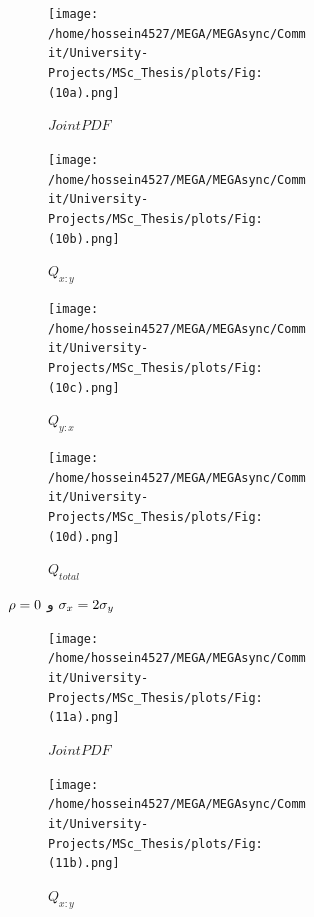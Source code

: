 \documentclass[a4paper,titlepage,12pt,fleqn,oneside]{report}
\begin{document}
	\begin{figure}[tbp]
		\centering
		\begin{subfigure}[b]{\textwidth}
			\renewcommand\thesubfigure{a}
			\begin{subfigure}[b]{0.24\textwidth}
				\renewcommand\thesubfigure{i}
				\centering
				\texttt{[image: /home/hossein4527/MEGA/MEGAsync/Commit/University-Projects/MSc\_Thesis/plots/Fig:(10a).png]}
				\caption{$Joint PDF$}
				\label{fig:3.1.1}
			\end{subfigure}
			\hfill
			\begin{subfigure}[b]{0.24\textwidth}
				\renewcommand\thesubfigure{ii}
				\centering
				\texttt{[image: /home/hossein4527/MEGA/MEGAsync/Commit/University-Projects/MSc\_Thesis/plots/Fig:(10b).png]}
				\caption{$Q_{x:y}$}
				\label{fig:3.1.2}
			\end{subfigure}
			\hfill
			\begin{subfigure}[b]{0.24\textwidth}
				\renewcommand\thesubfigure{iii}
				\centering
				\texttt{[image: /home/hossein4527/MEGA/MEGAsync/Commit/University-Projects/MSc\_Thesis/plots/Fig:(10c).png]}
				\caption{$Q_{y:x}$}
				\label{fig:3.1.3}
			\end{subfigure}
			\hfill
			\begin{subfigure}[b]{0.24\textwidth}
				\renewcommand\thesubfigure{iv}
				\centering
				\texttt{[image: /home/hossein4527/MEGA/MEGAsync/Commit/University-Projects/MSc\_Thesis/plots/Fig:(10d).png]}
				\caption{$Q_{total}$}
				\label{fig:3.1.4}
			\end{subfigure}
			\caption{$\protect\rho =0$ و $\protect\sigma _{x}=2\protect\sigma _{y}$}
			\label{fig:3.1}
		\end{subfigure}
		\begin{subfigure}[b]{\textwidth}
			\renewcommand\thesubfigure{b}
			\begin{subfigure}[b]{0.24\textwidth}
				\renewcommand\thesubfigure{i}
				\centering
				\texttt{[image: /home/hossein4527/MEGA/MEGAsync/Commit/University-Projects/MSc\_Thesis/plots/Fig:(11a).png]}
				\caption{$Joint PDF$}
				\label{fig:3.2.1}
			\end{subfigure}
			\hfill
			\begin{subfigure}[b]{0.24\textwidth}
				\renewcommand\thesubfigure{ii}
				\centering
				\texttt{[image: /home/hossein4527/MEGA/MEGAsync/Commit/University-Projects/MSc\_Thesis/plots/Fig:(11b).png]}
				\caption{$Q_{x:y}$}
				\label{fig:3.2.2}
			\end{subfigure}
			\hfill
			\begin{subfigure}[b]{0.24\textwidth}

\end{subfigure}
\end{subfigure}
\end{figure}
\end{document}
